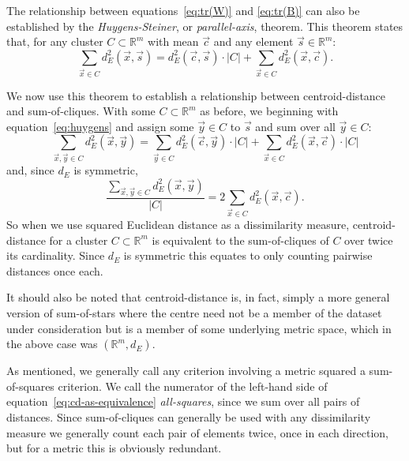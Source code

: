 The relationship between equations~\eqref{eq:tr(W)} and \eqref{eq:tr(B)} can
also be established by the \textit{Huygens-Steiner}, or
\textit{parallel-axis}, theorem.  This theorem states that, for any cluster $C
\subset \mathbb{R}^m$ with mean $\vec{c}$ and any element $\vec{s} \in
\mathbb{R}^m$:
\begin{equation}
  \label{eq:huygens}
  \sum_{\vec{x} \in C} d_E^2(\vec{x},\vec{s}) = d_E^2(\vec{c},\vec{s}) \cdot |C| +
                             \sum_{\vec{x} \in C} d_E^2(\vec{x},\vec{c}).
\end{equation}

We now use this theorem to establish a relationship between centroid-distance
and sum-of-cliques.  With some $C \subset \mathbb{R}^m$ as before, we
beginning with equation~\eqref{eq:huygens} and assign some $\vec{y} \in C$ to
$\vec{s}$ and sum over all $\vec{y} \in C$:
\begin{equation*}
  \sum_{\vec{x},\vec{y} \in C} d_E^2(\vec{x},\vec{y}) = \sum_{\vec{y} \in C}
  d_E^2(\vec{c},\vec{y}) \cdot |C| 
  + \sum_{\vec{x} \in C} d_E^2(\vec{x},\vec{c}) \cdot |C|
\end{equation*}
and, since $d_E$ is symmetric,
\begin{equation}
  \label{eq:cd-as-equivalence}
  \frac{\displaystyle \sum_{\vec{x},\vec{y} \in C} d_E^2(\vec{x},\vec{y})}
       {|C|}
  = 2 \sum_{\vec{x} \in C} d_E^2(\vec{x},\vec{c}).
\end{equation}
So when we use squared Euclidean distance as a dissimilarity measure,
centroid-distance for a cluster $C \subset \mathbb{R}^m$ is equivalent to the
sum-of-cliques of $C$ over twice its cardinality.  Since $d_E$ is symmetric
this equates to only counting pairwise distances once each.

It should also be noted that centroid-distance is, in fact, simply a more
general version of sum-of-stars where the centre need not be a member of the
dataset under consideration but is a member of some underlying metric space,
which in the above case was $(\mathbb{R}^m,d_E)$.

As mentioned, we generally call any criterion involving a metric squared a
sum-of-squares criterion.  We call the numerator of the left-hand side of
equation~\eqref{eq:cd-as-equivalence} \textit{all-squares}, since we sum over
all pairs of distances.  Since sum-of-cliques can generally be used with any
dissimilarity measure we generally count each pair of elements twice, once in
each direction, but for a metric this is obviously redundant.

